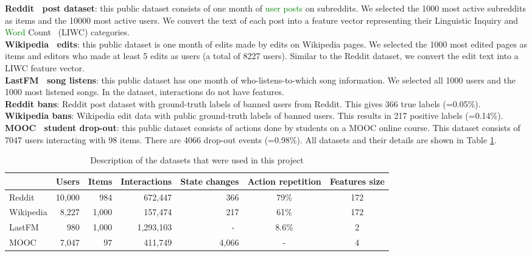 \textbf{Reddit~\cite{Reddit} post dataset}: this public dataset consists of one month of \textcolor{green}{user posts} %
on subreddits. We selected the 1000 most active subreddits as items and the 10000 most active users. We convert the text of each post into a feature vector representing their Linguistic Inquiry and \textcolor{green}{Word} %
Count~\cite{pennebaker01LIWC} (LIWC) categories.\\
\textbf{Wikipedia~\cite{Wiki} edits}: this public dataset is one month of edits made by edits on Wikipedia pages. We selected the 1000 most edited pages as items and editors who made at least 5 edits as users (a total of 8227 users). Similar to the Reddit dataset, we convert the edit text into a LIWC feature vector.\\
\textbf{LastFM~\cite{10.1007/978-3-642-33486-3_5lastFM} song listens}: this public dataset has one month of who-listens-to-which song information. We selected all 1000 users and the 1000 most listened songs. In the dataset, interactions do not have features.\\
\textbf{Reddit bans}: Reddit post dataset with ground-truth labels of banned users from Reddit. This gives 366 true labels (=0.05\%).\\
\textbf{Wikipedia bans}: Wikipedia edit data with public ground-truth labels of banned users. This results in 217 positive labels (=0.14\%).\\
\textbf{MOOC~\cite{mooc} student drop-out}: this public dataset consists of actions done by students on a MOOC online course. This dataset consists of 7047 users interacting with 98 items. There are 4066 drop-out events (=0.98\%). All datasets and their details are shown in Table \ref{description data}. \\

\setlength\tabcolsep{0.12cm} %
\begin{table}[htbp]
    \centering
    \begin{tabular}{@{}lrrrrcc@{}}
    \toprule
    & Users & Items & Interactions & State changes & Action repetition & Features size \\
    \midrule
    Reddit & 10,000 & 984 & 672,447 & 366 & 79\% & 172 \\
    Wikipedia & 8,227 & 1,000 & 157,474 & 217 & 61\% & 172 \\
    LastFM & 980 & 1,000 & 1,293,103 & -\textcolor{white}{0} & 8.6\% & 2 \\
    MOOC & 7,047 & 97 & 411,749 & 4,066 & - & 4 \\
    \bottomrule
    \end{tabular}
    \caption{Description of the datasets that were used in this project}
    \label{description data}
\end{table}
\setlength\tabcolsep{6pt} 

